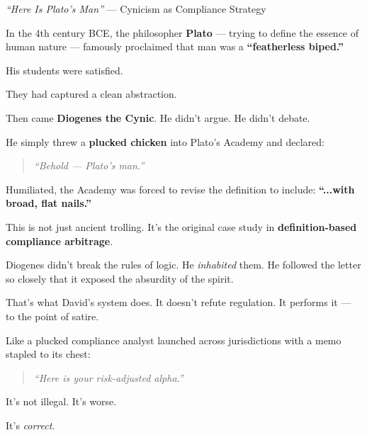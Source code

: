   \begin{HistoricalSidebar}{\textit{“Here Is Plato’s Man”} — Cynicism as Compliance Strategy}

    In the 4th century BCE, the philosopher \textbf{Plato} 
    --- trying to define the essence of human nature ---
    famously proclaimed that man was a \textbf{“featherless biped.”}

    \medskip
    
    His students were satisfied.

    \medskip
    
    They had captured a clean abstraction.  

    \medskip
    
    Then came \textbf{Diogenes the Cynic}.  
    He didn’t argue.  
    He didn’t debate.

    \medskip
    
    He simply threw a \textbf{plucked chicken} into Plato’s Academy and declared:
    
    \begin{quote}
      \textit{“Behold — Plato’s man.”}
    \end{quote}
    
    Humiliated, the Academy was forced to revise the definition to include:  
    \textbf{“...with broad, flat nails.”}
    
    \medskip
    
    This is not just ancient trolling.  
    It’s the original case study in \textbf{definition-based compliance arbitrage}.

    \medskip
    
    Diogenes didn’t break the rules of logic.  
    He \textit{inhabited} them.  
    He followed the letter so closely that it exposed the absurdity of the spirit.
    
    \medskip
    
    That’s what David’s system does.  
    It doesn’t refute regulation.  
    It performs it — to the point of satire.

    \medskip
    
    Like a plucked compliance analyst launched across jurisdictions with a memo stapled to its chest:

    
    \begin{quote}
      \textit{“Here is your risk-adjusted alpha.”}
    \end{quote}

    
    It’s not illegal.  
    It’s worse.

    \medskip
    
    It’s \textit{correct}.
  \end{HistoricalSidebar}

